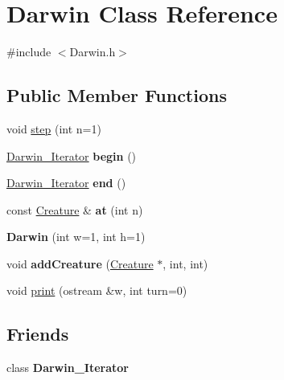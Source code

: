 \hypertarget{classDarwin}{\section{Darwin Class Reference}
\label{classDarwin}
}


{\ttfamily \#include $<$Darwin.\-h$>$}

\subsection*{Public Member Functions}
\begin{DoxyCompactItemize}
\item 
void \hyperlink{classDarwin_a0d2638a42288b3588dd2edca3f9252e9}{step} (int n=1)
\item 
\hypertarget{classDarwin_a4e33d343a1c2624442c2b7e5ed378053}{\hyperlink{classDarwin__Iterator}{Darwin\-\_\-\-Iterator} {\bfseries begin} ()}\label{classDarwin_a4e33d343a1c2624442c2b7e5ed378053}

\item 
\hypertarget{classDarwin_a4213db821993b8baaa587746335660ea}{\hyperlink{classDarwin__Iterator}{Darwin\-\_\-\-Iterator} {\bfseries end} ()}\label{classDarwin_a4213db821993b8baaa587746335660ea}

\item 
\hypertarget{classDarwin_a5fa1bd92338f783740407ae2bf188f1f}{const \hyperlink{classCreature}{Creature} \& {\bfseries at} (int n)}\label{classDarwin_a5fa1bd92338f783740407ae2bf188f1f}

\item 
\hypertarget{classDarwin_a045d481594ec3a616c266a13cc4b89c2}{{\bfseries Darwin} (int w=1, int h=1)}\label{classDarwin_a045d481594ec3a616c266a13cc4b89c2}

\item 
\hypertarget{classDarwin_aa8ba3b5a820d6bf68888c07be9ff34af}{void {\bfseries add\-Creature} (\hyperlink{classCreature}{Creature} $\ast$, int, int)}\label{classDarwin_aa8ba3b5a820d6bf68888c07be9ff34af}

\item 
void \hyperlink{classDarwin_aa707da4e90db5d6a4e15f8e65f15134f}{print} (ostream \&w, int turn=0)
\end{DoxyCompactItemize}
\subsection*{Friends}
\begin{DoxyCompactItemize}
\item 
\hypertarget{classDarwin_a45a59c9aa68fc4c29a090ee25b3745b9}{class {\bfseries Darwin\-\_\-\-Iterator}}\label{classDarwin_a45a59c9aa68fc4c29a090ee25b3745b9}

\end{DoxyCompactItemize}


